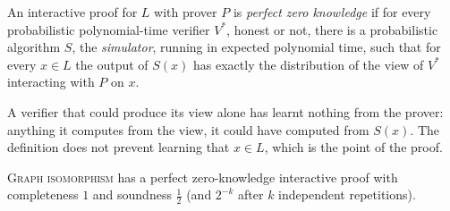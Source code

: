 \begin{definition}\label{def:zk}
An interactive proof for $L$ with prover $P$ is \emph{perfect zero knowledge} if for every probabilistic polynomial-time verifier $V^*$, honest or not, there is a probabilistic algorithm $S$, the \emph{simulator}, running in expected polynomial time, such that for every $x\in L$ the output of $S(x)$ has exactly the distribution of the view of $V^*$ interacting with $P$ on $x$.
\end{definition}

A verifier that could produce its view alone has learnt nothing from the prover: anything it computes from the view, it could have computed from $S(x)$. The definition does not prevent learning that $x\in L$, which is the point of the proof.

\begin{theorem}\label{thm:zkgi}
\textup{\textsc{Graph isomorphism}} has a perfect zero-knowledge interactive proof with completeness $1$ and soundness $\frac12$ (and $2^{-k}$ after $k$ independent repetitions).
\end{theorem}

